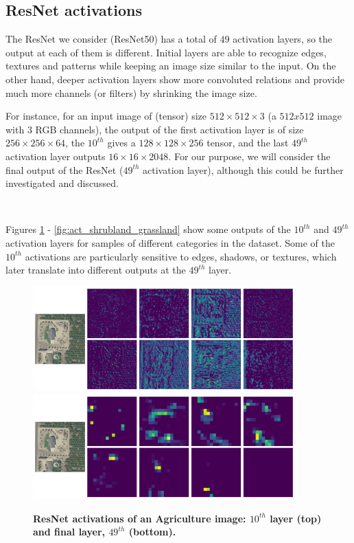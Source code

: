 \subsection{ResNet activations}

The ResNet we consider (ResNet50) has a total of $49$ activation layers, so the output at each of them is different. Initial layers are able to recognize edges, textures and patterns while keeping an image size similar to the input. On the other hand, deeper activation layers show more convoluted relations and provide much more channels (or filters) by shrinking the image size.

For instance, for an input image of (tensor) size $512 \times 512 \times 3$ (a $512x512$ image with $3$ RGB channels), the output of the first activation layer is of size $256 \times 256 \times 64$, the $10^{th}$ gives a $128 \times 128 \times 256$ tensor, and the last $49^{th}$ activation layer outputs $16 \times 16 \times 2048$. For our purpose, we will consider the final output of the ResNet ($49^{th}$ activation layer), although this could be further investigated and discussed.

\

Figures \ref{fig:act_agriculture} - \ref{fig:act_shrubland_grassland} show some outputs of the $10^{th}$ and $49^{th}$ activation layers for samples of different categories in the dataset. Some of the $10^{th}$ activations are particularly sensitive to edges, shadows, or textures, which later translate into different outputs at the $49^{th}$ layer.

\begin{figure}[h!]
	\centering
	\includegraphics[width=0.9\textwidth]{Figures/activations/agriculture_l2_s1_activation_10.png}
	\includegraphics[width=0.9\textwidth]{Figures/activations/agriculture_l2_s1_activation_49.png}
	\captionsetup{width=1\linewidth}
	\caption{\textbf{ResNet activations of an Agriculture image: $10^{th}$ layer (top) and final layer, $49^{th}$ (bottom).}}
	\label{fig:act_agriculture}
\end{figure}

